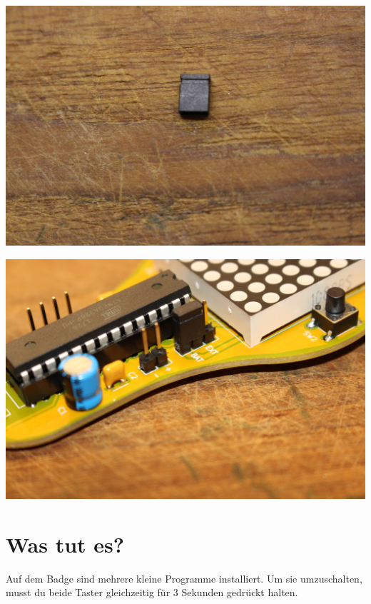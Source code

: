 \documentclass{article}
\begin{document}
\begin{minipage}[b]{0.5\textwidth}
	\includegraphics[width=\textwidth]{Bilder/IMG_5629.JPG}
\end{minipage}
\begin{minipage}[b]{0.5\textwidth}
	\includegraphics[width=\textwidth]{Bilder/IMG_5634.JPG}
\end{minipage}

\section{Was tut es?}

Auf dem Badge sind mehrere kleine Programme installiert. Um sie umzuschalten, musst du beide Taster gleichzeitig für 3 Sekunden gedrückt halten.\\
\end{document}
